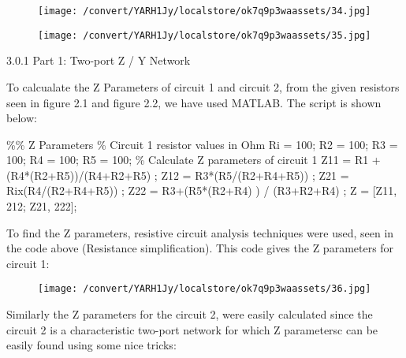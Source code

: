 \documentclass[12pt]{report}
\begin{document}
\begin{figure}[h]

\texttt{[image: /convert/YARH1Jy/localstore/ok7q9p3waassets/34.jpg]}

\centering

\end{figure}

\par

\vspace{10pt}

\begin{figure}[h]

\texttt{[image: /convert/YARH1Jy/localstore/ok7q9p3waassets/35.jpg]}

\centering

\end{figure}

    3.0.1 Part 1: Two-port Z / Y Network 

\vspace{10pt}

    To calcualate the Z Parameters of circuit 1 and circuit 2, from the given  resistors seen in figure 2.1 and figure 2.2, we have used MATLAB. The script  is shown below: 

\vspace{10pt}

    \%\% Z Parameters  \% Circuit 1 resistor values in Ohm  Ri = 100;    R2 = 100;  R3 = 100;  R4 = 100;  R5 = 100;    \% Calculate Z parameters of circuit 1  Z11 = R1 + (R4*(R2+R5))/(R4+R2+R5) ;  Z12 = R3*(R5/(R2+R4+R5)) ;   Z21 = Rix(R4/(R2+R4+R5)) ;   Z22 = R3+(R5*(R2+R4) ) / (R3+R2+R4) ;   Z = [Z11, 212; Z21, 222]; 

\vspace{10pt}

    To find the Z parameters, resistive circuit analysis techniques were used,  seen in the code above (Resistance simplification). This code gives the Z  parameters for circuit 1: 

\vspace{10pt}

\begin{figure}[h]

\texttt{[image: /convert/YARH1Jy/localstore/ok7q9p3waassets/36.jpg]}

\centering

\end{figure}

    Similarly the Z parameters for the circuit 2, were easily calculated since the  circuit 2 is a characteristic two-port network for which Z parametersc can be  easily found using some nice tricks: 
\end{document}
